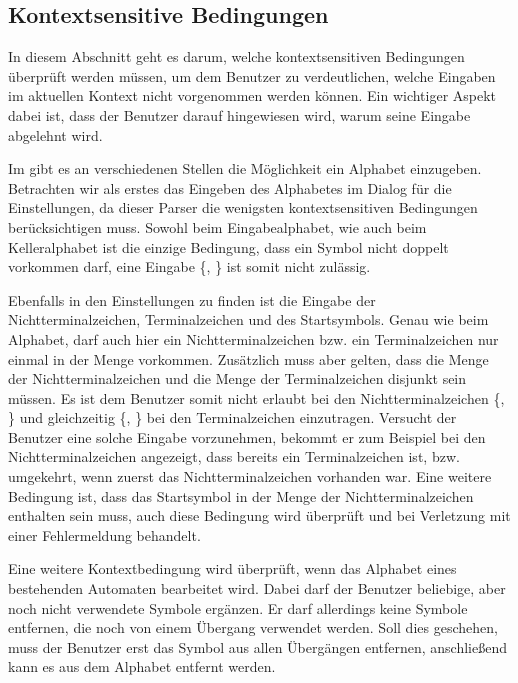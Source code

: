 \subsection{Kontextsensitive Bedingungen}\label{ParserContext}

In diesem Abschnitt geht es darum, welche kontextsensitiven Bedingungen
über\-prüft werden müssen, um dem Benutzer zu verdeutlichen, welche Eingaben im
aktuellen Kontext nicht vorgenommen werden können. Ein wichtiger Aspekt dabei
ist, dass der Benutzer darauf hingewiesen wird, warum seine Eingabe abgelehnt
wird.\vspace{10pt}

Im \gtitool gibt es an verschiedenen Stellen die Möglichkeit ein Alphabet
einzugeben. Betrachten wir als erstes das Eingeben des Alphabetes im Dialog für
die Einstellungen, da dieser Parser die wenigsten kontextsensitiven Bedingungen
berücksichtigen muss. Sowohl beim Eingabealphabet, wie auch beim Kelleralphabet
ist die einzige Bedingung, dass ein Symbol nicht doppelt vorkommen darf, eine
Eingabe \{, \} ist somit nicht zulässig.\vspace{10pt}

Ebenfalls in den Einstellungen zu finden ist die Eingabe der
Nichtterminalzeichen, Terminalzeichen und des Startsymbols. Genau wie beim
Alphabet, darf auch hier ein Nichtterminalzeichen bzw. ein Terminalzeichen nur
einmal in der Menge vorkommen. Zusätzlich muss aber gelten, dass die Menge der
Nichtterminalzeichen  und die Menge der Terminalzeichen disjunkt sein müssen. Es
ist dem Benutzer somit nicht erlaubt bei den Nichtterminalzeichen
\{, \} und gleichzeitig
\{, \} bei den Terminalzeichen einzutragen.
Versucht der Benutzer eine solche Eingabe vorzunehmen, bekommt er zum Beispiel
bei den Nichtterminalzeichen angezeigt, dass  bereits ein
Terminalzeichen ist, bzw. umgekehrt, wenn zuerst das Nichtterminalzeichen
vorhanden war. Eine weitere Bedingung ist, dass das Startsymbol in der Menge der
Nichtterminalzeichen enthalten sein muss, auch diese Bedingung wird überprüft
und bei Verletzung mit einer Fehlermeldung behandelt.\vspace{10pt}

Eine weitere Kontextbedingung wird überprüft, wenn das Alphabet eines
bestehenden Automaten bearbeitet wird. Dabei darf der Benutzer beliebige, aber
noch nicht verwendete Symbole ergänzen. Er darf allerdings keine Symbole
entfernen, die noch von einem Übergang verwendet werden. Soll dies geschehen,
muss der Benutzer erst das Symbol aus allen Übergängen entfernen,
anschließend kann es aus dem Alphabet entfernt werden.\vspace{10pt}

